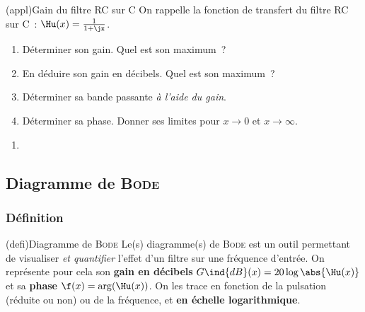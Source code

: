 \documentclass[../../main/main.tex]{subfiles}
\begin{document}
\begin{tcb*}[breakable](appl){Gain du filtre RC sur C}
	On rappelle la fonction de transfert du filtre RC sur C~: $\Hu(x) =
		\frac{1}{1+\jx}$.
	\begin{enumerate}
		\item Déterminer son gain. Quel est son maximum~?
		\item En déduire son gain en décibels. Quel est son maximum~?
		\item Déterminer sa bande passante \textit{à l'aide du gain}.
		\item Déterminer sa phase. Donner ses limites pour $x\to 0$ et $x\to\infty$.
	\end{enumerate}
	\tcblower
	\vspace{12pt}
	\begin{enumerate}
		\mitem
		\psw{
		\[
			\boxed{G(x) = \abs{\Hu} = \frac{1}{\sqrt{1+x^{2}}}}
			\qet
			\xul{G_{\max} = G(0) = 1}
		\]
		}
		\mitem
		\mitem
		\vspace{-15pt}
		\item
	\end{enumerate}
\end{tcb*}

\subsection{Diagramme de \textsc{Bode}}

\subsubsection{Définition}
\begin{tcb*}(defi){Diagramme de \textsc{Bode}}
	Le(s) diagramme(s) de \textsc{Bode} est un outil permettant de visualiser
	\textit{et quantifier} l'effet d'un filtre sur une fréquence d'entrée. On
	représente pour cela son \textbf{gain en décibels} $G\ind{dB}(x) = 20 \log
		\abs{\Hu(x)}$ et sa
	\textbf{phase} $\f(x) = \arg({\Hu(x)})$.
	\smallbreak
	On les trace en fonction de la pulsation (réduite ou non) ou de la fréquence,
	et \textbf{en échelle logarithmique}.
\end{tcb*}
\end{document}
